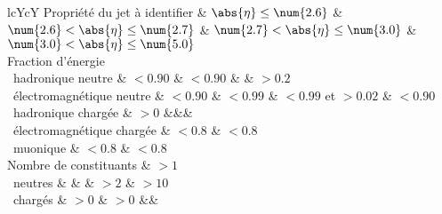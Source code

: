 \begin{tabularx}{\textwidth}{lcYcY}
\toprule
Propriété du jet à identifier & $\abs{\eta}\leq\num{2.6}$ & $\num{2.6}<\abs{\eta}\leq\num{2.7}$ & $\num{2.7}<\abs{\eta}\leq\num{3.0}$ & $\num{3.0}<\abs{\eta}\leq\num{5.0}$ \\
\midrule
Fraction d'énergie\\
\ hadronique neutre & $<\num{0.90}$ & $<\num{0.90}$ &  & $>\num{0.2}$ \\
\ électromagnétique neutre & $<\num{0.90}$ & $<\num{0.99}$ & $<\num{0.99}$ et $>\num{0.02}$ & $<\num{0.90}$ \\
\ hadronique chargée & $>\num{0}$ &&&\\
\ électromagnétique chargée & $<\num{0.8}$ & $<\num{0.8}$ \\
\ muonique & $<\num{0.8}$ & $<\num{0.8}$ \\
\midrule
Nombre de constituants & $>\num{1}$\\
\ neutres & & & $>\num{2}$ & $>\num{10}$ \\
\ chargés & $>\num{0}$ & $>\num{0}$ &&\\
\bottomrule
\end{tabularx}
